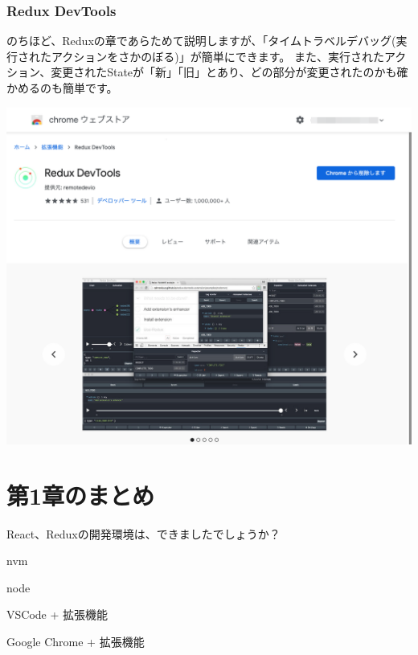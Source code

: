 \clearpage


\subsubsection*{Redux DevTools}
\keeplastskip{
  \label{sec:1-3-1-3}
  \par\nobreak
}

のちほど、Reduxの章であらためて説明しますが、「タイムトラベルデバッグ(実行されたアクションをさかのぼる)」が簡単にできます。
また、実行されたアクション、変更されたStateが「新」「旧」とあり、どの部分が変更されたのかも確かめるのも簡単です。

\begin{reviewimage}[H]%
\includegraphics[width=1.0\maxwidth]{./images/01-createDevEnv/01_11chromeExtReduxDevTools.png}%
\label{image:01-createDevEnv:01_11chromeExtReduxDevTools}
\end{reviewimage}

\section{第1章のまとめ}
\keeplastskip{
  \label{sec:1-4}
  \label{sec-chap01review}
  \par\nobreak
}

React、Reduxの開発環境は、できましたでしょうか？

\begin{starteritemize}
\item nvm
\item node
\item VSCode + 拡張機能
\item Google Chrome + 拡張機能
\end{starteritemize}

